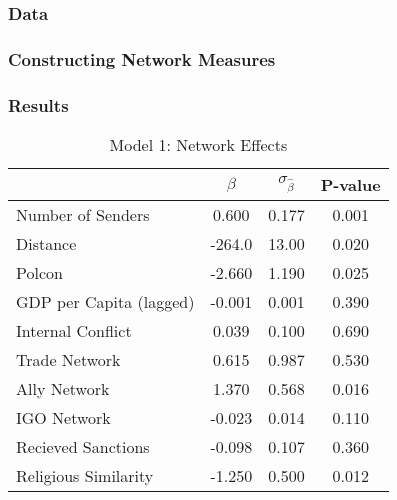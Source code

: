 \documentclass{beamer}
\begin{document}
\begin{frame}
\frametitle{Data}
\end{frame}

\begin{frame}
\frametitle{Constructing Network Measures}
\end{frame}

\begin{frame}
\frametitle{Results}

\begin{table}
\caption{Model 1: Network Effects}
\begin{tabular}{lccc}
\hline
& $\beta$ & $\sigma_{\hat{\beta}}$ & P-value \\
\hline
Number of Senders &  0.600 & 0.177 & 0.001 \\ 
Distance & -264.0 & 13.00 & 0.020 \\
Polcon & -2.660 &  1.190 & 0.025 \\
GDP per Capita (lagged) & -0.001 & 0.001 &  0.390 \\
Internal Conflict & 0.039 &  0.100 & 0.690 \\
Trade Network & 0.615 & 0.987 & 0.530 \\
Ally Network & 1.370 & 0.568 & 0.016 \\
IGO Network &  -0.023 & 0.014 & 0.110 \\
Recieved Sanctions & -0.098 & 0.107 & 0.360 \\
Religious Similarity &  -1.250 & 0.500  & 0.012 \\
\hline
\end{tabular}
\end{table}

\end{frame}

\end{document}
